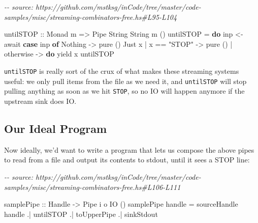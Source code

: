 \documentclass[]{article}
\newenvironment{Shaded}{}{}
\newcommand{\CommentTok}[1]{\textcolor[rgb]{0.38,0.63,0.69}{\textit{#1}}}
\newcommand{\DataTypeTok}[1]{\textcolor[rgb]{0.56,0.13,0.00}{#1}}
\newcommand{\FunctionTok}[1]{\textcolor[rgb]{0.02,0.16,0.49}{#1}}
\newcommand{\KeywordTok}[1]{\textcolor[rgb]{0.00,0.44,0.13}{\textbf{#1}}}
\newcommand{\NormalTok}[1]{#1}
\newcommand{\OperatorTok}[1]{\textcolor[rgb]{0.40,0.40,0.40}{#1}}
\newcommand{\OtherTok}[1]{\textcolor[rgb]{0.00,0.44,0.13}{#1}}
\newcommand{\StringTok}[1]{\textcolor[rgb]{0.25,0.44,0.63}{#1}}
\begin{document}
\begin{Shaded}
\begin{Highlighting}[]
\CommentTok{{-}{-} source: https://github.com/mstksg/inCode/tree/master/code{-}samples/misc/streaming{-}combinators{-}free.hs\#L95{-}L104}

\OtherTok{untilSTOP ::} \DataTypeTok{Monad}\NormalTok{ m }\OtherTok{=>} \DataTypeTok{Pipe} \DataTypeTok{String} \DataTypeTok{String}\NormalTok{ m ()}
\NormalTok{untilSTOP }\OtherTok{=} \KeywordTok{do}
\NormalTok{    inp }\OtherTok{<{-}}\NormalTok{ await}
    \KeywordTok{case}\NormalTok{ inp }\KeywordTok{of}
      \DataTypeTok{Nothing} \OtherTok{{-}>} \FunctionTok{pure}\NormalTok{ ()}
      \DataTypeTok{Just}\NormalTok{ x}
        \OperatorTok{|}\NormalTok{ x }\OperatorTok{==} \StringTok{"STOP"} \OtherTok{{-}>} \FunctionTok{pure}\NormalTok{ ()}
        \OperatorTok{|} \FunctionTok{otherwise}   \OtherTok{{-}>} \KeywordTok{do}
\NormalTok{            yield x}
\NormalTok{            untilSTOP}
\end{Highlighting}
\end{Shaded}

\texttt{untilSTOP} is really sort of the crux of what makes these streaming
systems useful: we only pull items from the file as we need it, and
\texttt{untilSTOP} will stop pulling anything as soon as we hit \texttt{STOP},
so no IO will happen anymore if the upstream sink does IO.

\hypertarget{our-ideal-program}{%
\subsection{Our Ideal Program}\label{our-ideal-program}}

Now ideally, we'd want to write a program that lets us compose the above pipes
to read from a file and output its contents to stdout, until it sees a STOP
line:

\begin{Shaded}
\begin{Highlighting}[]
\CommentTok{{-}{-} source: https://github.com/mstksg/inCode/tree/master/code{-}samples/misc/streaming{-}combinators{-}free.hs\#L106{-}L111}

\OtherTok{samplePipe ::} \DataTypeTok{Handle} \OtherTok{{-}>} \DataTypeTok{Pipe}\NormalTok{ i o }\DataTypeTok{IO}\NormalTok{ ()}
\NormalTok{samplePipe handle }\OtherTok{=}
\NormalTok{       sourceHandle handle}
    \OperatorTok{.|}\NormalTok{ untilSTOP}
    \OperatorTok{.|}\NormalTok{ toUpperPipe}
    \OperatorTok{.|}\NormalTok{ sinkStdout}
\end{Highlighting}
\end{Shaded}
\end{document}
